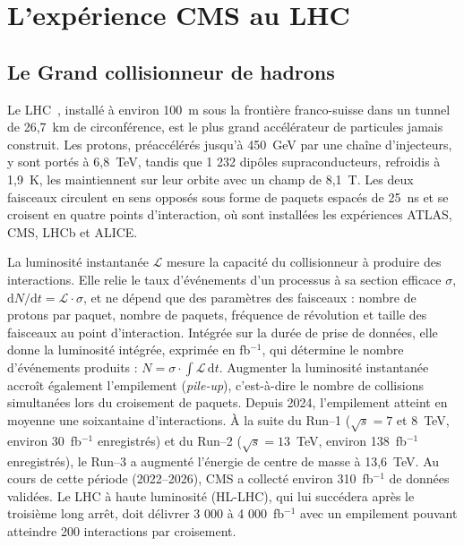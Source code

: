\section{L'expérience CMS au LHC}
\label{sec:resume:cms}

\subsection{Le Grand collisionneur de hadrons}

Le LHC~\cite{EvansBryant2008}, installé à environ 100~m sous la frontière franco-suisse dans un tunnel de 26,7~km de circonférence, est le plus grand accélérateur de particules jamais construit. Les protons, préaccélérés jusqu'à 450~GeV par une chaîne d'injecteurs, y sont portés à 6,8~TeV, tandis que 1 232 dipôles supraconducteurs, refroidis à 1,9~K, les maintiennent sur leur orbite avec un champ de 8,1~T. Les deux faisceaux circulent en sens opposés sous forme de paquets espacés de 25~ns et se croisent en quatre points d'interaction, où sont installées les expériences ATLAS, CMS, LHCb et ALICE.

La luminosité instantanée $\mathscr{L}$ mesure la capacité du collisionneur à produire des interactions. Elle relie le taux d'événements d'un processus à sa section efficace $\sigma$, $\mathrm{d}N/\mathrm{d}t=\mathscr{L}\cdot\sigma$, et ne dépend que des paramètres des faisceaux : nombre de protons par paquet, nombre de paquets, fréquence de révolution et taille des faisceaux au point d'interaction. Intégrée sur la durée de prise de données, elle donne la luminosité intégrée, exprimée en fb$^{-1}$, qui détermine le nombre d'événements produits : $\displaystyle N=\sigma\cdot\int\mathscr{L}\,\mathrm{d}t$. Augmenter la luminosité instantanée accroît également l'empilement (\textit{pile-up}), c'est-à-dire le nombre de collisions simultanées lors du croisement de paquets. Depuis 2024, l'empilement atteint en moyenne une soixantaine d'interactions. À la suite du Run--1 ($\sqrt{s}=7$ et 8~TeV, environ 30~fb$^{-1}$ enregistrés) et du Run--2 ($\sqrt{s}=13$~TeV, environ 138~fb$^{-1}$ enregistrés), le Run--3 a augmenté l'énergie de centre de masse à 13,6~TeV. Au cours de cette période (2022--2026), CMS a collecté environ 310~fb$^{-1}$ de données validées. Le LHC à haute luminosité (HL-LHC), qui lui succédera après le troisième long arrêt, doit délivrer 3 000 à 4 000~fb$^{-1}$ avec un empilement pouvant atteindre 200 interactions par croisement.


